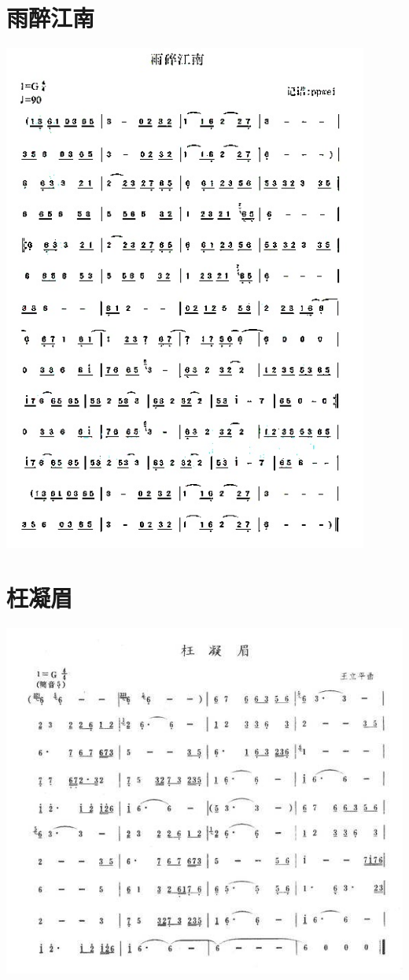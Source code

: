 \documentclass[cn,pad,chinese,chinesefont=nofont]{elegantbook}
\begin{document}
\section{雨醉江南}
    \includegraphics[width=0.9\textwidth]{dongxiao/雨醉江南.jpg}
\section{枉凝眉}
    \includegraphics[width=\textwidth]{dongxiao/枉凝眉.jpg}
\end{document}
